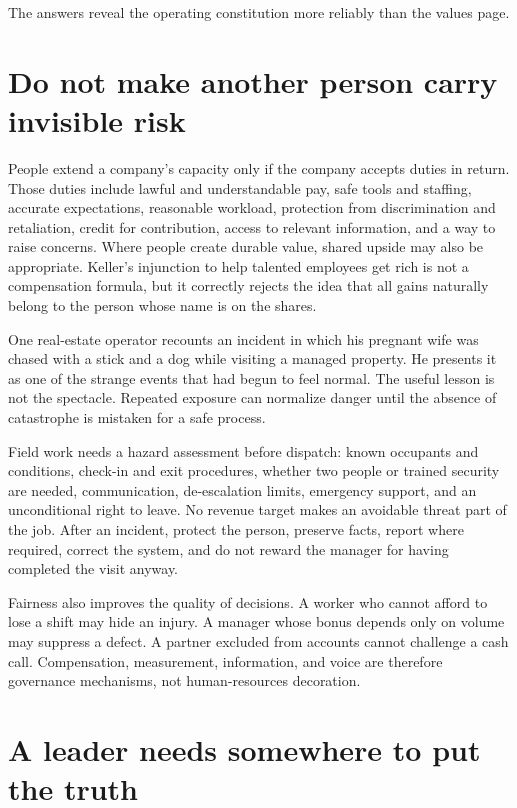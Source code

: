 The answers reveal the operating constitution more reliably than the values
page.

\section{Do not make another person carry invisible risk}

People extend a company's capacity only if the company accepts duties in
return. Those duties include lawful and understandable pay, safe tools and
staffing, accurate expectations, reasonable workload, protection from
discrimination and retaliation, credit for contribution, access to relevant
information, and a way to raise concerns. Where people create durable value,
shared upside may also be appropriate. Keller's injunction to help talented
employees get rich is not a compensation formula, but it correctly rejects the
idea that all gains naturally belong to the person whose name is on the shares.

One real-estate operator recounts an incident in which his pregnant wife was
chased with a stick and a dog while visiting a managed property. He presents it
as one of the strange events that had begun to feel normal. The useful lesson
is not the spectacle. Repeated exposure can normalize danger until the absence
of catastrophe is mistaken for a safe process.

Field work needs a hazard assessment before dispatch: known occupants and
conditions, check-in and exit procedures, whether two people or trained
security are needed, communication, de-escalation limits, emergency support,
and an unconditional right to leave. No revenue target makes an avoidable
threat part of the job. After an incident, protect the person, preserve facts,
report where required, correct the system, and do not reward the manager for
having completed the visit anyway.

Fairness also improves the quality of decisions. A worker who cannot afford to
lose a shift may hide an injury. A manager whose bonus depends only on volume
may suppress a defect. A partner excluded from accounts cannot challenge a
cash call. Compensation, measurement, information, and voice are therefore
governance mechanisms, not human-resources decoration.

\section{A leader needs somewhere to put the truth}

